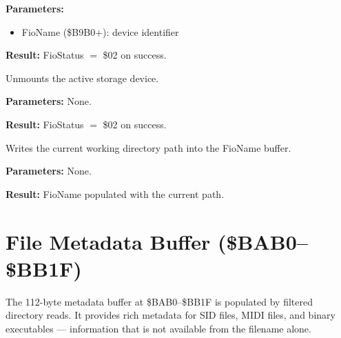 \textbf{Parameters:}
\begin{itemize}
  \item FioName (\$B9B0+): device identifier
\end{itemize}

\textbf{Result:} FioStatus $=$ \$02 on success.

\medskip


Unmounts the active storage device.

\textbf{Parameters:} None.

\textbf{Result:} FioStatus $=$ \$02 on success.

\medskip


Writes the current working directory path into the FioName buffer.

\textbf{Parameters:} None.

\textbf{Result:} FioName populated with the current path.


\section{File Metadata Buffer (\$BAB0--\$BB1F)}
\label{sec:fio-metadata}

The 112-byte metadata buffer at \$BAB0--\$BB1F is populated by filtered
directory reads.  It provides rich metadata for SID files, MIDI files, and
binary executables --- information that is not available from the filename
alone.



